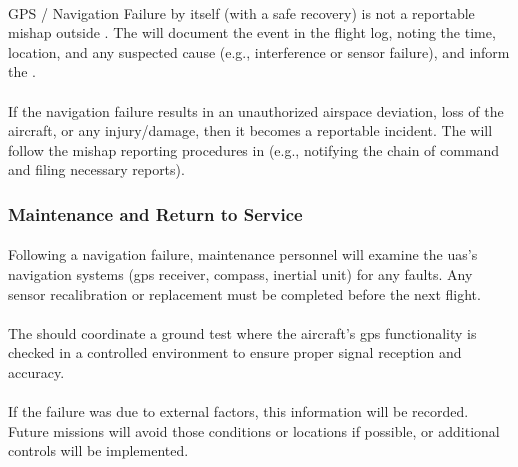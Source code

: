                 \paragraph{} GPS / Navigation Failure by itself (with a safe recovery) is not a reportable mishap outside \projectmars{}. The  will document the event in the flight log, noting the time, location, and any suspected cause (e.g., interference or sensor failure), and inform the .
                
                \paragraph{} If the navigation failure results in an unauthorized airspace deviation, loss of the aircraft, or any injury/damage, then it becomes a reportable incident. The  will follow the mishap reporting procedures in  (e.g., notifying the chain of command and filing necessary reports).

            \subsubsection{Maintenance and Return to Service}
        
                \paragraph{} Following a navigation failure, maintenance personnel will examine the \ac{uas}’s navigation systems (\ac{gps} receiver, compass, inertial unit) for any faults. Any sensor recalibration or replacement must be completed before the next flight.
                
                \paragraph{} The  should coordinate a ground test where the aircraft’s \ac{gps} functionality is checked in a controlled environment to ensure proper signal reception and accuracy.
                
                \paragraph{} If the failure was due to external factors, this information will be recorded. Future missions will avoid those conditions or locations if possible, or additional controls will be implemented.
                
